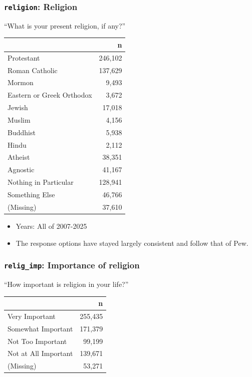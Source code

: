 \documentclass[10pt,article,oneside]{memoir}
\begin{document}
\subsubsection{\texorpdfstring{\texttt{religion}:
Religion}{religion: Religion}}\label{religion-religion}

``What is your present religion, if any?''

\begin{table}[H]
\centering
\begin{tabular}[t]{lr}
\toprule
 & n\\
\midrule
Protestant & 246,102\\
Roman Catholic & 137,629\\
Mormon & 9,493\\
Eastern or Greek Orthodox & 3,672\\
Jewish & 17,018\\
Muslim & 4,156\\
Buddhist & 5,938\\
Hindu & 2,112\\
Atheist & 38,351\\
Agnostic & 41,167\\
Nothing in Particular & 128,941\\
Something Else & 46,766\\
(Missing) & 37,610\\
\bottomrule
\end{tabular}
\end{table}

\begin{itemize}
\tightlist
\item
  Years: All of 2007-2025
\item
  The response options have stayed largely consistent and follow that of
  Pew.
\end{itemize}

\subsubsection{\texorpdfstring{\texttt{relig\_imp}: Importance of
religion}{relig\_imp: Importance of religion}}\label{relig_imp-importance-of-religion}

``How important is religion in your life?''

\begin{table}[H]
\centering
\begin{tabular}[t]{lr}
\toprule
 & n\\
\midrule
Very Important & 255,435\\
Somewhat Important & 171,379\\
Not Too Important & 99,199\\
Not at All Important & 139,671\\
(Missing) & 53,271\\
\bottomrule
\end{tabular}
\end{table}
\end{document}

